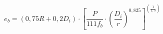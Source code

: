\documentclass[12pt]{article}
\begin{document}
\begin{displaymath}
e_b=\left(0,75R+0,2D_i\right)\cdot\left[{\frac{P}{111f_b}}\cdot{\left(\frac{D_i}{r}\right)^{0,825}}\right]^{\left(\frac{1}{1,5}\right)}
\end{displaymath}
\end{document}
